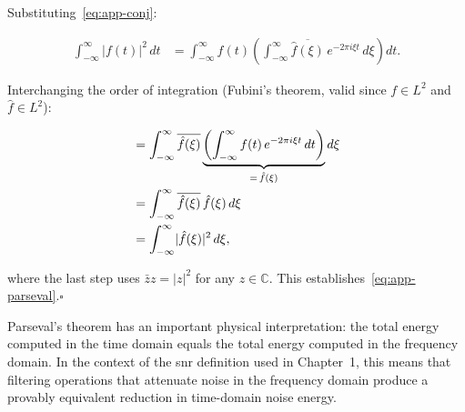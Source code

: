Substituting~\eqref{eq:app-conj}:

\begin{align}
  \int_{-\infty}^{\infty} \lvert f(t)\rvert^{2}\,dt
    &= \int_{-\infty}^{\infty} f(t)
         \left(
           \int_{-\infty}^{\infty}
             \overline{\hat{f}(\xi)}\,
             e^{-2\pi i\xi t}\,d\xi
         \right) dt.
       \label{eq:app-pars-step1}
\end{align}

Interchanging the order of integration (Fubini's theorem, valid
since $f \in L^{2}$ and $\hat{f} \in L^{2}$):

\begin{align}
  &= \int_{-\infty}^{\infty} \overline{\hat{f}(\xi)}
       \underbrace{%
         \left(
           \int_{-\infty}^{\infty} f(t)\,
           e^{-2\pi i\xi t}\,dt
         \right)%
       }_{=\,\hat{f}(\xi)}
     d\xi
     \label{eq:app-pars-fubini} \\
  &= \int_{-\infty}^{\infty}
       \overline{\hat{f}(\xi)}\,\hat{f}(\xi)\,d\xi \notag \\
  &= \int_{-\infty}^{\infty}
       \lvert\hat{f}(\xi)\rvert^{2}\,d\xi,
     \label{eq:app-pars-result}
\end{align}

where the last step uses $\bar{z}z = \lvert z \rvert^{2}$ for any
$z \in \mathbb{C}$.
This establishes~\eqref{eq:app-parseval}.\hfill$\square$

\bigskip

Parseval's theorem has an important physical interpretation: the
total energy computed in the time domain equals the total energy
computed in the frequency domain.
In the context of the \ac{snr} definition used in Chapter~1,
this means that filtering operations that attenuate
noise in the frequency domain produce a provably equivalent reduction
in time-domain noise energy.
